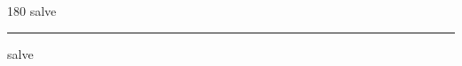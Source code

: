 
\begin{frame}
\begin{center}
\begin{turn}{180}
{\fontsize{2.5cm}{1em}\selectfont salve}
\end{turn}
\vspace{1em}\par  
\hrule
\vspace{1em}\par  
{\fontsize{2.5cm}{1em}\selectfont salve}
\end{center}
\end{frame}
